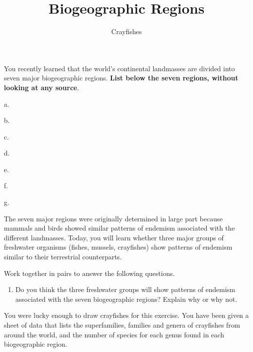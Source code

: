 \documentclass[11pt]{article}
\title{Biogeographic Regions}
\author{Crayfishes}
\date{}                                           %
\begin{document}
\maketitle
\thispagestyle{empty}


You recently learned that the world's continental landmasses are divided
into seven major biogeographic regions. \textbf{List below the seven
regions, without looking at any source}.

\begin{multicols}{2}
a.\vspace{0.5\baselineskip}

b.\vspace{0.5\baselineskip}

c.\vspace{0.5\baselineskip}

d.\vspace{0.5\baselineskip}

\columnbreak

e.\vspace{0.5\baselineskip}

f.\vspace{0.5\baselineskip}

g.\vspace{0.5\baselineskip}

\end{multicols}

The seven major regions were originally determined in large part because
mammals and birds showed similar patterns of endemism associated with
the different landmasses. Today, you will learn whether three major
groups of freshwater organisms (fishes, mussels, crayfishes) show
patterns of endemism similar to their terrestrial counterparts.

Work together in pairs to answer the following questions.

\begin{enumerate}[leftmargin=*]
\item Do you think the three freshwater groups will show patterns of
endemism associated with the seven biogeographic regions? Explain why or
why not.\vspace{10\baselineskip}

\end{enumerate}

You were lucky enough to draw crayfishes for this exercise. You have
been given a sheet of data that lists the superfamilies, families and
genera of crayfishes from around the world, and the number of species
for each genus found in each biogeographic region.
\end{document}
